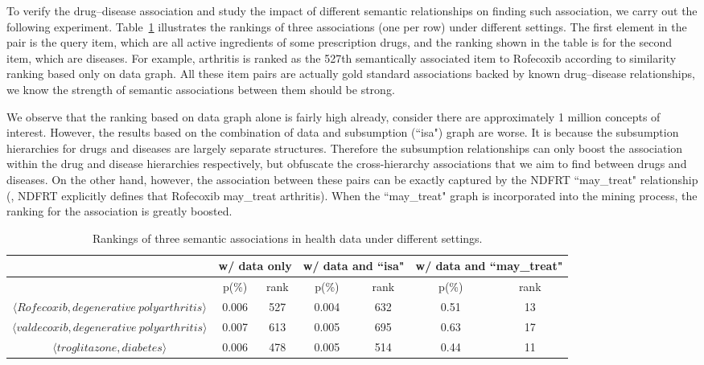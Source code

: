 To verify the drug--disease association and study the impact of different semantic relationships on finding such association, we carry out the following experiment. Table~\ref{tbl:health_exp} illustrates the rankings of three associations (one per row) under different settings. The first element in the pair is the query item, which are all active ingredients of some prescription drugs, and the ranking shown in the table is for the second item, which are diseases. For example, arthritis is ranked as the 527th semantically associated item to Rofecoxib according to similarity ranking based only on data graph. All these item pairs are actually gold standard associations backed by known drug--disease relationships, we know the strength of semantic associations between them should be strong.

We observe that the ranking based on data graph alone is fairly high already, consider there are approximately 1 million concepts of interest. However, the results based on the combination of data and subsumption (``isa") graph are worse. It is because the subsumption hierarchies for drugs and diseases are largely separate structures. Therefore the subsumption relationships can only boost the association within the drug and disease hierarchies respectively, but obfuscate the cross-hierarchy associations that we aim to find between drugs and diseases. On the other hand, however, the association between these pairs can be exactly captured by the NDFRT ``may\_treat" relationship (\eg, NDFRT explicitly defines that Rofecoxib may\_treat arthritis). When the ``may\_treat" graph is incorporated into the mining process, the ranking for the association is greatly boosted.

\begin{table}[tbh]\scriptsize
\begin{center}
\begin{tabular}{ c || c  c || c  c || c  c }
\hline
        &   \multicolumn{2}{c||}{w/ data only}  &   \multicolumn{2}{c||}{w/ data and ``isa"} & \multicolumn{2}{c}{w/ data and ``may\_treat"}\\
\hline
\hline
                        	&   p(\%)   &   rank    &   p(\%)    &   rank    &   p(\%)    &    rank    \\
\hline
$\langle Rofecoxib, degenerative~polyarthritis\rangle$  &   0.006   &   527     &   0.004    &   632     &   0.51     &     13     \\
$\langle valdecoxib, degenerative~polyarthritis\rangle$  &   0.007   &   613     &   0.005    &   695     &   0.63     &     17     \\
$\langle troglitazone, diabetes\rangle$  &   0.006   &   478     &   0.005    &   514     &   0.44     &     11     \\
\hline
\end{tabular}
\end{center}
\caption{\label{tbl:health_exp}Rankings of three semantic associations in health data under different settings.}
\end{table}





